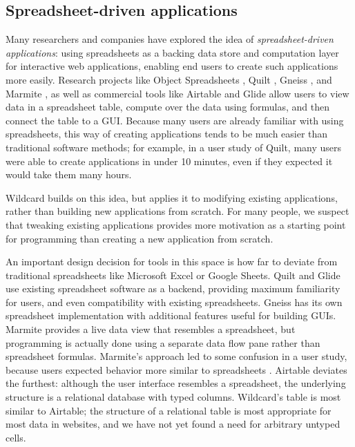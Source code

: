 \documentclass[english,submission]{programming}
\begin{document}
\hypertarget{spreadsheet-driven-applications}{%
\subsection{Spreadsheet-driven
applications}\label{spreadsheet-driven-applications}}

Many researchers and companies have explored the idea of
\emph{spreadsheet-driven applications}: using spreadsheets as a backing
data store and computation layer for interactive web applications,
enabling end users to create such applications more easily. Research
projects like Object Spreadsheets \autocite{mccutchen2016}, Quilt
\autocite{benson2014}, Gneiss \autocite{chang2014}, and Marmite
\autocite{wong2007}, as well as commercial tools like Airtable
\autocite{zotero-79} and Glide \autocite{zotero-81} allow users to view
data in a spreadsheet table, compute over the data using formulas, and
then connect the table to a GUI. Because many users are already familiar
with using spreadsheets, this way of creating applications tends to be
much easier than traditional software methods; for example, in a user
study of Quilt, many users were able to create applications in under 10
minutes, even if they expected it would take them many hours.

Wildcard builds on this idea, but applies it to modifying existing
applications, rather than building new applications from scratch. For
many people, we suspect that tweaking existing applications provides
more motivation as a starting point for programming than creating a new
application from scratch.

An important design decision for tools in this space is how far to
deviate from traditional spreadsheets like Microsoft Excel or Google
Sheets. Quilt and Glide use existing spreadsheet software as a backend,
providing maximum familiarity for users, and even compatibility with
existing spreadsheets. Gneiss has its own spreadsheet implementation
with additional features useful for building GUIs. Marmite provides a
live data view that resembles a spreadsheet, but programming is actually
done using a separate data flow pane rather than spreadsheet formulas.
Marmite's approach led to some confusion in a user study, because users
expected behavior more similar to spreadsheets \autocite{wong2007}.
Airtable deviates the furthest: although the user interface resembles a
spreadsheet, the underlying structure is a relational database with
typed columns. Wildcard's table is most similar to Airtable; the
structure of a relational table is most appropriate for most data in
websites, and we have not yet found a need for arbitrary untyped cells.
\end{document}
